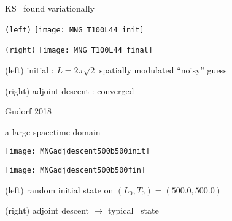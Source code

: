 \begin{frame}{KS \twot\ found variationally}
\begin{minipage}[height=.32\textheight]{.30\textwidth}
\centering \small{\texttt{(left)}}
\texttt{[image: MNG\_T100L44\_init]}
\end{minipage}
\begin{minipage}[height=.32\textheight]{.30\textwidth}
\centering \small{\texttt{(right)}}
\texttt{[image: MNG\_T100L44\_final]}
\end{minipage}

\vfill
(left) initial : $\bar{L}=2\pi\sqrt{2}$ spatially modulated ``noisy'' guess

(right) adjoint descent : converged \twot\

\vfill\hfill        Gudorf 2018
\end{frame}

\begin{frame}{a large spacetime domain}
\begin{minipage}[height=.45\textwidth]{.45\textwidth}
\centering %
\texttt{[image: MNGadjdescent500b500init]}
\end{minipage}
\begin{minipage}[height=.45\textwidth]{.45\textwidth}
\centering %
\texttt{[image: MNGadjdescent500b500fin]}
\end{minipage}

(left) random initial state on
$(L_0,T_0)=(500.0,500.0)$

(right) adjoint descent $\to$ typical \KS\ state
\end{frame}

